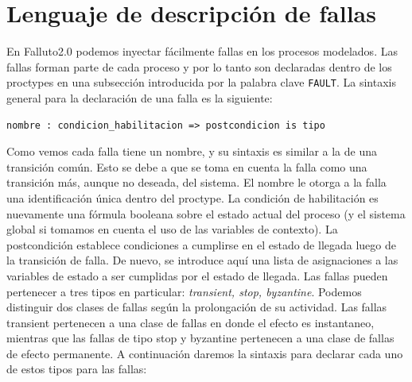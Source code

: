 \documentclass[titlepage, 12pt]{book}
\begin{document}
\section{Lenguaje de descripci\'on de fallas}
En Falluto2.0 podemos inyectar f\'acilmente fallas en los procesos modelados. Las fallas forman parte de cada proceso y por lo tanto son declaradas dentro de los proctypes en una subsecci\'on introducida por la palabra clave \texttt{FAULT}. La sintaxis general para la declaraci\'on de una falla es la siguiente: \begin{verbatim}nombre : condicion_habilitacion => postcondicion is tipo\end{verbatim}
Como vemos cada falla tiene un nombre, y su sintaxis es similar a la de una transici\'on com\'un. Esto se debe a que se toma en cuenta la falla como una transici\'on m\'as, aunque no deseada, del sistema. El nombre le otorga a la falla una identificaci\'on \'unica dentro del proctype. La condici\'on de habilitaci\'on es nuevamente una f\'ormula booleana sobre el estado actual del proceso (y el sistema global si tomamos en cuenta el uso de las variables de contexto). La postcondici\'on establece condiciones a cumplirse en el estado de llegada luego de la transici\'on de falla. De nuevo, se introduce aqu\'i una lista de asignaciones a las variables de estado a ser cumplidas por el estado de llegada. Las fallas pueden pertenecer a tres tipos en particular: \textit{transient, stop, byzantine}. Podemos distinguir dos clases de fallas seg\'un la prolongaci\'on de su actividad. Las fallas transient pertenecen a una clase de fallas en donde el efecto es instantaneo, mientras que las fallas de tipo stop y byzantine pertenecen a una clase de fallas de efecto permanente. A continuaci\'on daremos la sintaxis para declarar cada uno de estos tipos para las fallas:
\end{document}
